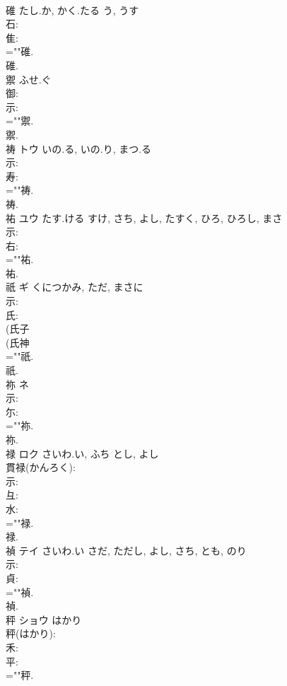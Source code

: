 \documentclass[8pt]{extreport}
\begin{document}
\begin{CJK}{UTF8}{min}
\\	碓		たし.か, かく.たる	う, うす			
\\	石: 
\\	隹: 
\\	=""碓.
\\	碓.
\\	禦		ふせ.ぐ				
\\	御: 
\\	示: 
\\	=""禦.
\\	禦.
\\	祷	トウ	いの.る, いの.り, まつ.る		
\\	示: 
\\	寿: 
\\	=""祷.
\\	祷.
\\	祐	ユウ	たす.ける	すけ, さち, よし, たすく, ひろ, ひろし, まさ	
\\	示: 
\\	右: 
\\	=""祐.
\\	祐.
\\	祇	ギ	くにつかみ, ただ, まさに		
\\	示: 
\\	氏: 
\\	(氏子 
\\	(氏神 
\\	=""祇.
\\	祇.
\\	祢	ネ			
\\	示: 
\\	尓: 
\\	=""祢.
\\	祢.
\\	禄	ロク	さいわ.い, ふち	とし, よし	
\\	貫禄(かんろく): 
\\	示: 
\\	彑: 
\\	水: 
\\	=""禄.
\\	禄.
\\	禎	テイ	さいわ.い	さだ, ただし, よし, さち, とも, のり	
\\	示: 
\\	貞: 
\\	=""禎.
\\	禎.
\\	秤	ショウ	はかり		
\\	秤(はかり): 
\\	禾: 
\\	平: 
\\	=""秤.

\end{CJK}
\end{document}
